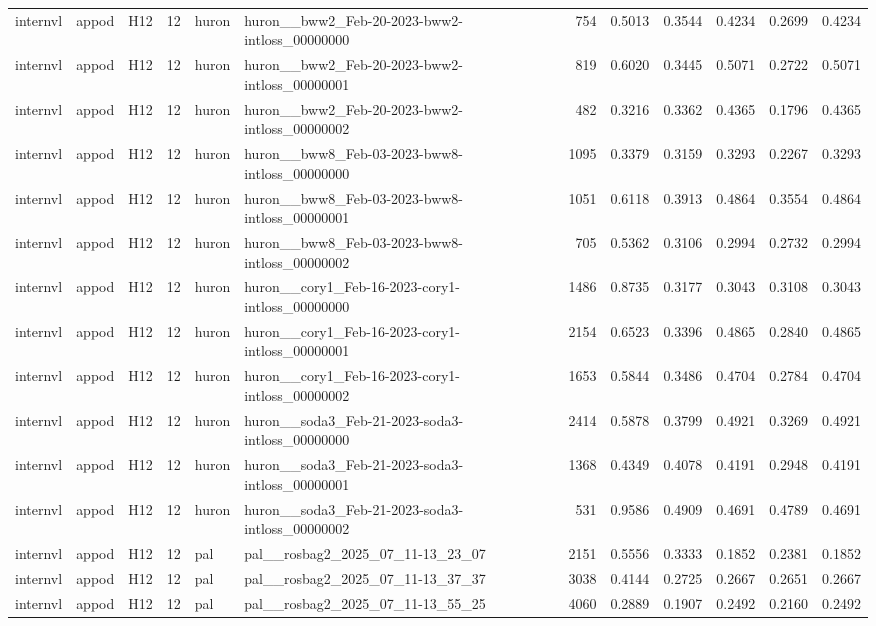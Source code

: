 \begin{table}[tbp]
\begin{tabular}{lllrllrrrrrr}
internvl & appod & H12 & 12 & huron & huron\_\_bww2\_Feb-20-2023-bww2-intloss\_00000000 & 754 & 0.5013 & 0.3544 & 0.4234 & 0.2699 & 0.4234 \\
internvl & appod & H12 & 12 & huron & huron\_\_bww2\_Feb-20-2023-bww2-intloss\_00000001 & 819 & 0.6020 & 0.3445 & 0.5071 & 0.2722 & 0.5071 \\
internvl & appod & H12 & 12 & huron & huron\_\_bww2\_Feb-20-2023-bww2-intloss\_00000002 & 482 & 0.3216 & 0.3362 & 0.4365 & 0.1796 & 0.4365 \\
internvl & appod & H12 & 12 & huron & huron\_\_bww8\_Feb-03-2023-bww8-intloss\_00000000 & 1095 & 0.3379 & 0.3159 & 0.3293 & 0.2267 & 0.3293 \\
internvl & appod & H12 & 12 & huron & huron\_\_bww8\_Feb-03-2023-bww8-intloss\_00000001 & 1051 & 0.6118 & 0.3913 & 0.4864 & 0.3554 & 0.4864 \\
internvl & appod & H12 & 12 & huron & huron\_\_bww8\_Feb-03-2023-bww8-intloss\_00000002 & 705 & 0.5362 & 0.3106 & 0.2994 & 0.2732 & 0.2994 \\
internvl & appod & H12 & 12 & huron & huron\_\_cory1\_Feb-16-2023-cory1-intloss\_00000000 & 1486 & 0.8735 & 0.3177 & 0.3043 & 0.3108 & 0.3043 \\
internvl & appod & H12 & 12 & huron & huron\_\_cory1\_Feb-16-2023-cory1-intloss\_00000001 & 2154 & 0.6523 & 0.3396 & 0.4865 & 0.2840 & 0.4865 \\
internvl & appod & H12 & 12 & huron & huron\_\_cory1\_Feb-16-2023-cory1-intloss\_00000002 & 1653 & 0.5844 & 0.3486 & 0.4704 & 0.2784 & 0.4704 \\
internvl & appod & H12 & 12 & huron & huron\_\_soda3\_Feb-21-2023-soda3-intloss\_00000000 & 2414 & 0.5878 & 0.3799 & 0.4921 & 0.3269 & 0.4921 \\
internvl & appod & H12 & 12 & huron & huron\_\_soda3\_Feb-21-2023-soda3-intloss\_00000001 & 1368 & 0.4349 & 0.4078 & 0.4191 & 0.2948 & 0.4191 \\
internvl & appod & H12 & 12 & huron & huron\_\_soda3\_Feb-21-2023-soda3-intloss\_00000002 & 531 & 0.9586 & 0.4909 & 0.4691 & 0.4789 & 0.4691 \\
internvl & appod & H12 & 12 & pal & pal\_\_rosbag2\_2025\_07\_11-13\_23\_07 & 2151 & 0.5556 & 0.3333 & 0.1852 & 0.2381 & 0.1852 \\
internvl & appod & H12 & 12 & pal & pal\_\_rosbag2\_2025\_07\_11-13\_37\_37 & 3038 & 0.4144 & 0.2725 & 0.2667 & 0.2651 & 0.2667 \\
internvl & appod & H12 & 12 & pal & pal\_\_rosbag2\_2025\_07\_11-13\_55\_25 & 4060 & 0.2889 & 0.1907 & 0.2492 & 0.2160 & 0.2492 \\

\end{tabular}
\end{table}
